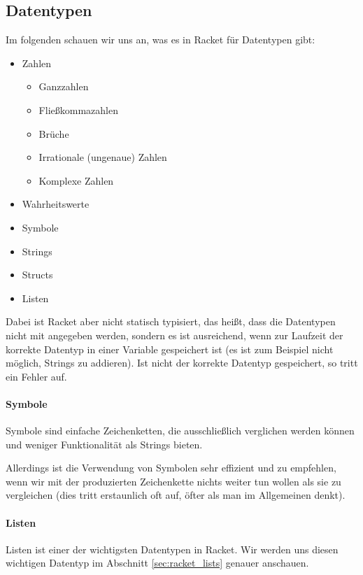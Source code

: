 \subsection{Datentypen}
	
	Im folgenden schauen wir uns an, was es in Racket für Datentypen gibt:
	\begin{itemize}
		\item Zahlen
			\begin{itemize}
				\item Ganzzahlen
				\item Fließkommazahlen
				\item Brüche
				\item Irrationale (ungenaue) Zahlen
				\item Komplexe Zahlen
			\end{itemize}
		\item Wahrheitswerte
		\item Symbole
		\item Strings
		\item Structs
		\item Listen
	\end{itemize}

	Dabei ist Racket aber nicht statisch typisiert, das heißt, dass die Datentypen nicht mit angegeben werden, sondern es ist ausreichend, wenn zur Laufzeit der korrekte Datentyp in einer Variable gespeichert ist (es ist zum Beispiel nicht möglich, Strings zu addieren). Ist nicht der korrekte Datentyp gespeichert, so tritt ein Fehler auf.
	
	\paragraph{Symbole}
		Symbole sind einfache Zeichenketten, die ausschließlich verglichen werden können und weniger Funktionalität als Strings bieten.
		
		Allerdings ist die Verwendung von Symbolen sehr effizient und zu empfehlen, wenn wir mit der produzierten Zeichenkette nichts weiter tun wollen als sie zu vergleichen (dies tritt erstaunlich oft auf, öfter als man im Allgemeinen denkt).
	
	\paragraph{Listen}
		Listen ist einer der wichtigsten Datentypen in Racket. Wir werden uns diesen wichtigen Datentyp im Abschnitt \ref{sec:racket_lists} genauer anschauen.
	
